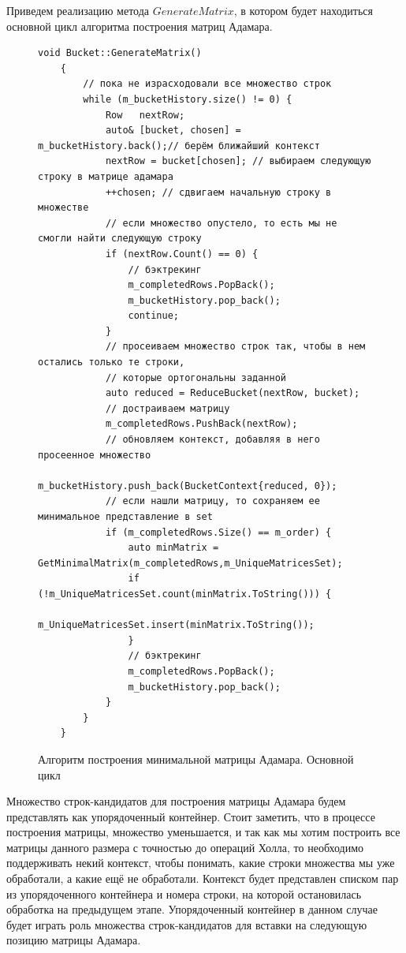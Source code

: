 \documentclass[a4paper, 14pt]{extreport}
\begin{document}
Приведем реализацию метода $GenerateMatrix$, в котором будет находиться основной цикл алгоритма построения матриц Адамара.

\begin{figure}[H]
    \centering
    \begin{minipage}{\linewidth}
    \begin{lstlisting}[language=С++, tabsize=4, showspaces=false, basicstyle=\fontsize{9.5}{11.5}\selectfont, numbers=none]
    void Bucket::GenerateMatrix()
    {
        // пока не израсходовали все множество строк
        while (m_bucketHistory.size() != 0) {
            Row   nextRow;
            auto& [bucket, chosen] = m_bucketHistory.back();// берём ближайший контекст
            nextRow = bucket[chosen]; // выбираем следующую строку в матрице адамара
            ++chosen; // сдвигаем начальную строку в множестве
            // если множество опустело, то есть мы не смогли найти следующую строку
            if (nextRow.Count() == 0) {
                // бэктрекинг
                m_completedRows.PopBack();
                m_bucketHistory.pop_back();
                continue;
            }
            // просеиваем множество строк так, чтобы в нем остались только те строки,
            // которые ортогональны заданной
            auto reduced = ReduceBucket(nextRow, bucket);
            // достраиваем матрицу
            m_completedRows.PushBack(nextRow);
            // обновляем контекст, добавляя в него просеенное множество
            m_bucketHistory.push_back(BucketContext{reduced, 0});
            // если нашли матрицу, то сохраняем ее минимальное представление в set
            if (m_completedRows.Size() == m_order) {
                auto minMatrix = GetMinimalMatrix(m_completedRows,m_UniqueMatricesSet);
                if (!m_UniqueMatricesSet.count(minMatrix.ToString())) {
                    m_UniqueMatricesSet.insert(minMatrix.ToString());
                }
                // бэктрекинг
                m_completedRows.PopBack();
                m_bucketHistory.pop_back();
            }
        }
    }
    \end{lstlisting}
    \end{minipage}
    \caption{Алгоритм построения минимальной матрицы Адамара. Основной цикл}
    \label{alg:builder_main}
\end{figure}

Множество строк-кандидатов для построения матрицы Адамара будем представлять как упорядоченный контейнер. Стоит заметить, что в процессе построения матрицы, множество уменьшается, и так как мы хотим построить все матрицы данного размера с точностью до операций Холла, то необходимо поддерживать некий контекст, чтобы понимать, какие строки множества мы уже обработали, а какие ещё не обработали. Контекст будет представлен списком пар из упорядоченного контейнера и номера строки, на которой остановилась обработка на предыдущем этапе. Упорядоченный контейнер в данном случае будет играть роль множества строк-кандидатов для вставки на следующую позицию матрицы Адамара.
\end{document}
